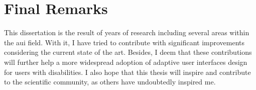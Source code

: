\section{Final Remarks}
\label{sec:final_remarks}

This dissertation is the result of years of research including several areas
within the \acl{aui} field. With it, I have tried to contribute with significant 
improvements considering the current state of the art. Besides, I deem that these 
contributions will further help a more widespread adoption of adaptive user 
interfaces design for users with disabilities. I also hope that this thesis will 
inspire and contribute to the scientific community, as others have undoubtedly 
inspired me. 